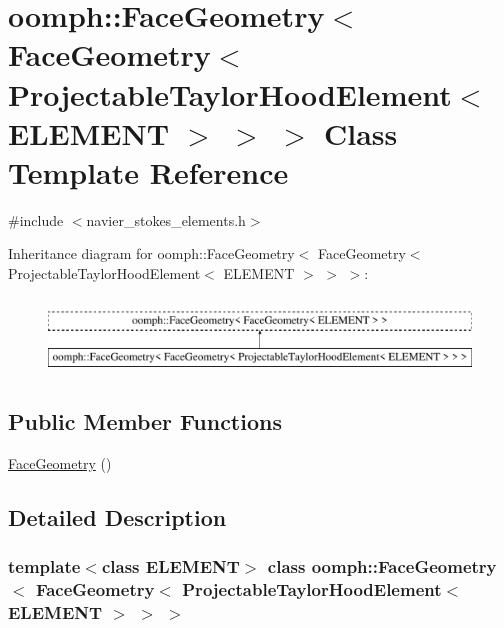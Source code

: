 \hypertarget{classoomph_1_1FaceGeometry_3_01FaceGeometry_3_01ProjectableTaylorHoodElement_3_01ELEMENT_01_4_01_4_01_4}{}\section{oomph\+:\+:Face\+Geometry$<$ Face\+Geometry$<$ Projectable\+Taylor\+Hood\+Element$<$ E\+L\+E\+M\+E\+NT $>$ $>$ $>$ Class Template Reference}
\label{classoomph_1_1FaceGeometry_3_01FaceGeometry_3_01ProjectableTaylorHoodElement_3_01ELEMENT_01_4_01_4_01_4}


{\ttfamily \#include $<$navier\+\_\+stokes\+\_\+elements.\+h$>$}

Inheritance diagram for oomph\+:\+:Face\+Geometry$<$ Face\+Geometry$<$ Projectable\+Taylor\+Hood\+Element$<$ E\+L\+E\+M\+E\+NT $>$ $>$ $>$\+:\begin{figure}[H]
\begin{center}
\leavevmode
\includegraphics[height=2.000000cm]{classoomph_1_1FaceGeometry_3_01FaceGeometry_3_01ProjectableTaylorHoodElement_3_01ELEMENT_01_4_01_4_01_4}
\end{center}
\end{figure}
\subsection*{Public Member Functions}
\begin{DoxyCompactItemize}
\item 
\hyperlink{classoomph_1_1FaceGeometry_3_01FaceGeometry_3_01ProjectableTaylorHoodElement_3_01ELEMENT_01_4_01_4_01_4_a5656bb5469d433f46209af2ed69faf38}{Face\+Geometry} ()
\end{DoxyCompactItemize}


\subsection{Detailed Description}
\subsubsection*{template$<$class E\+L\+E\+M\+E\+NT$>$\newline
class oomph\+::\+Face\+Geometry$<$ Face\+Geometry$<$ Projectable\+Taylor\+Hood\+Element$<$ E\+L\+E\+M\+E\+N\+T $>$ $>$ $>$}

